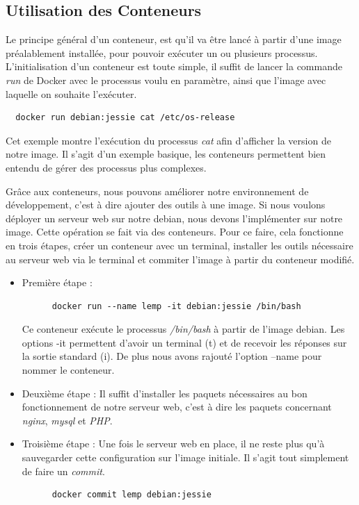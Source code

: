 \documentclass[12pt,a4paper]{article}
\begin{document}
\subsection{Utilisation des Conteneurs}

Le principe général d'un conteneur, est qu'il va être lancé à partir d'une image préalablement installée, pour pouvoir exécuter un ou plusieurs processus. L'initialisation d'un conteneur est toute simple, il suffit de lancer la commande \textit{run} de Docker avec le processus voulu en paramètre, ainsi que l'image avec laquelle on souhaite l'exécuter. 

\begin{lstlisting}
  docker run debian:jessie cat /etc/os-release
\end{lstlisting}
Cet exemple montre l'exécution du processus \textit{cat} afin d'afficher la version de notre image. Il s'agit d'un exemple basique, les conteneurs permettent bien entendu de gérer des processus plus complexes.

Grâce aux conteneurs, nous pouvons améliorer notre environnement de développement, c'est à dire ajouter des outils à une image. Si nous voulons déployer un serveur web sur notre debian, nous devons l'implémenter sur notre image. Cette opération se fait via des conteneurs. Pour ce faire, cela fonctionne en trois étapes, créer un conteneur avec un terminal, installer les outils nécessaire au serveur web via le terminal et commiter l'image à partir du conteneur modifié.

\begin{itemize}
  \item{Première étape :}
    \begin{lstlisting}
      docker run --name lemp -it debian:jessie /bin/bash
    \end{lstlisting}
    Ce conteneur exécute le processus \textit{/bin/bash} à partir de l'image debian. Les options -it permettent d'avoir un terminal (t) et de recevoir les réponses sur la sortie standard (i). De plus nous avons rajouté l'option --name pour nommer le conteneur.

  \item{Deuxième étape :}
    Il suffit d'installer les paquets nécessaires au bon fonctionnement de notre serveur web, c'est à dire les paquets concernant \textit{nginx}, \textit{mysql} et \textit{PHP}.

  \item{Troisième étape :}
    Une fois le serveur web en place, il ne reste plus qu'à sauvegarder cette configuration sur l'image initiale. Il s'agit tout simplement de faire un \textit{commit}.
    \begin{lstlisting}
      docker commit lemp debian:jessie
    \end{lstlisting}
\end{itemize}
\end{document}
